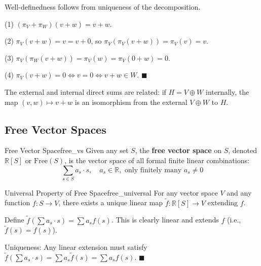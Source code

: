 \documentclass[11pt, letterpaper, openany]{book}
\renewenvironment{proof}[1][\proofname]{%
  \tcolorbox[blanker, breakable, left=1em,
    before skip=1em, after skip=1em,
    borderline west={2pt}{0pt}{MagicTeal!50},
    colback=MagicCream,
    before upper={\textcolor{MagicTeal}{\sffamily\bfseries #1.}\space}
  ]%
}{%
  \hfill\textcolor{MagicTeal}{\ensuremath{\blacksquare}}\endtcolorbox%
}
\begin{document}
\begin{proof}
Well-definedness follows from uniqueness of the decomposition.

(1) $(\pi_V + \pi_W)(v + w) = v + w$.

(2) $\pi_V(v + w) = v = v + 0$, so $\pi_V(\pi_V(v+w)) = \pi_V(v) = v$.

(3) $\pi_V(\pi_W(v+w)) = \pi_V(w) = \pi_V(0 + w) = 0$.

(4) $\pi_V(v+w) = 0 \iff v = 0 \iff v + w \in W$.
\end{proof}

\begin{remark}
The external and internal direct sums are related: if $H = V \oplus W$ internally, the map $(v, w) \mapsto v + w$ is an isomorphism from the external $V \oplus W$ to $H$.
\end{remark}

\subsection{Free Vector Spaces}

\begin{defn}{Free Vector Space}{free_vs}
Given any set $S$, the \textbf{free vector space} on $S$, denoted $\mathbb{R}[S]$ or $\text{Free}(S)$, is the vector space of all formal finite linear combinations:
\[\sum_{s \in S} a_s \cdot s, \quad a_s \in \mathbb{R}, \text{ only finitely many } a_s \neq 0\]
\end{defn}

\begin{thm}{Universal Property of Free Space}{free_universal}
For any vector space $V$ and any function $f: S \to V$, there exists a unique linear map $\tilde{f}: \mathbb{R}[S] \to V$ extending $f$.

\begin{center}
\end{center}
\end{thm}

\begin{proof}
Define $\tilde{f}(\sum a_s \cdot s) = \sum a_s f(s)$. This is clearly linear and extends $f$ (i.e., $\tilde{f}(s) = f(s)$).

Uniqueness: Any linear extension must satisfy $\tilde{f}(\sum a_s \cdot s) = \sum a_s \tilde{f}(s) = \sum a_s f(s)$.
\end{proof}
\end{document}
